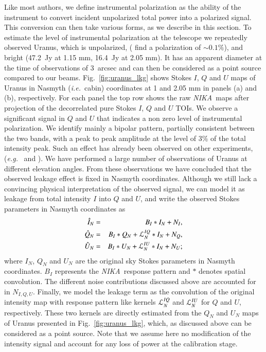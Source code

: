 \documentclass[twocolumn, traditabstract]{aa}
\newcommand{\nika}{{\it NIKA}}
\begin{document}
Like most authors, we define instrumental polarization as the ability of the
instrument to convert incident unpolarized total power into a polarized
signal. This conversion can then take various forms, as we describe in this
section. To estimate the level of instrumental polarization at the telescope we
repeatedly observed Uranus, which is unpolarized, (\citealt{polka_apex} find a
polarization of $\sim 0.1 \%$), and bright (47.2~Jy at 1.15 mm, 16.4~Jy at
2.05 mm). It has an apparent diameter at the time of observations of 3~arcsec and
can then be considered as a point source compared to our
beams. Fig.~\ref{fig:uranus_lkg} shows Stokes $I$, $Q$ and $U$ maps of Uranus in
Nasmyth ({\it i.e.}~cabin) coordinates at 1 and 2.05 mm in panels (a) and (b),
respectively.  For each panel the top row shows the raw \nika\ maps after
projection of the decorrelated pure Stokes $I$, $Q$ and $U$ TOIs. We observe a
significant signal in $Q$ and $U$ that indicates a non zero level of
instrumental polarization. We identify mainly a bipolar pattern, partially
consistent between the two bands, with a peak to peak amplitude at the level of
3\% of the total intensity peak. Such an effect has already been observed on
other experiments, ({\it e.g.}~\citealt{thum2008} and
\citealt[][]{2015ApJ...806..206B}).  We have performed a large number of
observations of Uranus at different elevation angles. From these observations we
have concluded that the observed leakage effect is fixed in Nasmyth
coordinates. Although we still lack a convincing physical interpretation of the
observed signal, we can model it as leakage from total intensity $I$ into $Q$
and $U$, and write the observed Stokes parameters in Nasmyth coordinates as
 \begin{eqnarray}
 \hat{I}_{N}  & = & B_{I} * I_{N} + N_{I}, \label{eq:i_leak}\\
 \hat{Q}_{N}  & = & B_{I} * Q_{N} + {\cal{L}}^{IQ}_{N} * I_{N} + N_{Q}, \label{eq:q_leak} \\
 \hat{U}_{N}  & = & B_{I} * U_{N} + {\cal{L}}^{IU}_{N} * I_{N} + N_{U}; \label{eq:u_leak}
 \end{eqnarray}
 where $I_{N}$, $Q_{N}$ and $U_{N}$ are the original sky Stokes parameters in
 Nasmyth coordinates. $B_{I}$ represents the \nika\ response pattern and $*$ denotes
 spatial convolution. The different noise contributions discussed above are
 accounted for in $N_{I,Q,U}$. Finally, we model the leakage term as the
 convolution of the original intensity map with response pattern like kernels
 ${\cal{L}}^{IQ}_{N}$ and ${\cal{L}}^{IU}_{N}$ for $Q$ and $U$,
 respectively. These two kernels are directly estimated from the $Q_{N}$ and
 $U_{N}$ maps of Uranus presented in Fig.~\ref{fig:uranus_lkg}, which, as
 discussed above can be considered as a point source. Note that we assume here
 no modification of the intensity signal and account for any loss of power at
 the calibration stage.
\end{document}

